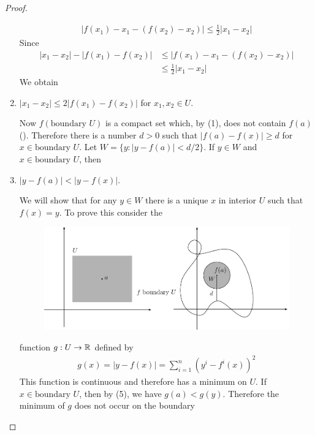 \begin{proof}
\begin{enumerate}[label={\upshape(\arabic*)}]
\begin{align*}
                \left|f(x_1) - x_1 -\left(f(x_2) - x_2\right)\right| 
                \le \frac{1}{2}\left|x_1-x_2\right|
            \end{align*}
            Since 
            \begin{align*}
                |x_1-x_2| - |f(x_1) - f(x_2)| 
                & \le |f(x_1) - x_1 - \left(f(x_2) - x_2\right)| \\
                & \le \frac12 |x_1 - x_2|
            \end{align*}
            We obtain 
        \item $|x_1 - x_2|\le 2|f(x_1) - f(x_2)|$ for $x_1, x_2 \in U$.\par 
            Now $f(\text{boundary } U)$ is a compact set which, by (1), does not 
            contain $f(a)$ (). Therefore there is a number $d>0$ such that 
            $|f(a) - f(x)|\ge d$ for $x\in \text{boundary } U$. Let $W= \{y:|y-f(a)| < d/2\}$. 
            If $y\in W$ and $x\in \text{boundary } U$, then 
        \item $|y-f(a)| < |y-f(x)|$.\par 
            We will show that for any $y\in W$ there is a unique $x$ in
            interior $U$ such that $f(x) = y$. To prove this consider the
            \begin{figure}[!htb]
              \centering
              \includegraphics[width=1.45\linewidth, angle=90]{./pics/Fig2-3.pdf}
              \caption{}
              \label{Fig 2-3}
            \end{figure}
            function $g:U\to \mathbb{R}$ defined by 
            \begin{align*}
                g(x) 
                = |y-f(x)|
                = \sum_{i=1}^{n}{\left(y^i - f^i(x)\right)^2} 
            \end{align*}
            This function is continuous and therefore has a minimum on $U$. If $x\in \text{boundary } U$, then 
            by (5), we have $g(a)< g(y)$. Therefore the minimum of $g$ does not occur on the boundary 

\end{enumerate}
\end{proof}
